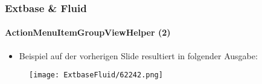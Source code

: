 
\begin{frame}[fragile]
	\frametitle{Extbase \& Fluid}
	\framesubtitle{ActionMenuItemGroupViewHelper (2)}

	\begin{itemize}
		\item Beispiel auf der vorherigen Slide resultiert in folgender Ausgabe:
	\end{itemize}

	\begin{figure}
		\texttt{[image: ExtbaseFluid/62242.png]}
	\end{figure}

\end{frame}


